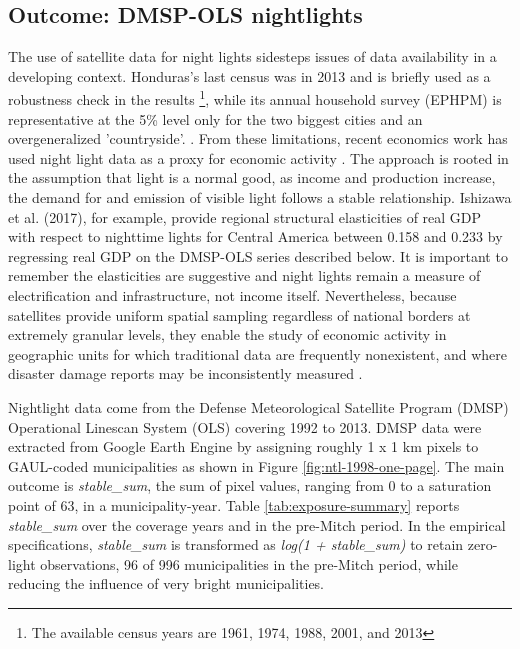 \documentclass[12pt]{article}
\begin{document}
\subsection{Outcome: DMSP-OLS nightlights}
The use of satellite data for night lights sidesteps issues of data availability in a developing context. Honduras's last census was in 2013 and is briefly used as a robustness check in the results \footnote{The available census years are 1961, 1974, 1988, 2001, and 2013}, while its annual household survey (EPHPM) is representative at the 5\% level only for the two biggest cities and an overgeneralized 'countryside'. \parencite{ipumsinternational2025}.
From these limitations, recent economics work has used night light data as a proxy for economic activity \parencite{donaldson2016view, henderson2011bright}. The approach is rooted in the assumption that light is a normal good, as income and production increase, the demand for and emission of visible light follows a stable relationship.  Ishizawa et al. (2017), for example, provide regional structural elasticities of real GDP with respect to nighttime lights for Central America between 0.158 and 0.233 by regressing real GDP on the DMSP-OLS series described below. It is important to remember the elasticities are suggestive and night lights remain a measure of electrification and infrastructure, not income itself. Nevertheless, because satellites provide uniform spatial sampling regardless of national borders at extremely granular levels, they enable the study of economic activity in geographic units for which traditional data are frequently nonexistent, and where disaster damage reports may be inconsistently measured \parencite{donaldson2016view, henderson2011bright}.

Nightlight data come from the Defense Meteorological Satellite Program (DMSP) Operational Linescan System (OLS) covering 1992 to 2013. DMSP data were extracted from Google Earth Engine by assigning roughly 1 x 1 km pixels to GAUL-coded municipalities as shown in Figure \ref{fig:ntl-1998-one-page}. The main outcome is \textit{stable\_sum}, the sum of pixel values, ranging from 0 to a saturation point of 63, in a municipality-year. Table \ref{tab:exposure-summary} reports \textit{stable\_sum} over the coverage years and in the pre-Mitch period. In the empirical specifications, \textit{stable\_sum} is transformed as \textit{log(1 + stable\_sum)} to retain zero-light observations, 96 of 996 municipalities in the pre-Mitch period, while reducing the influence of very bright municipalities.
\end{document}
